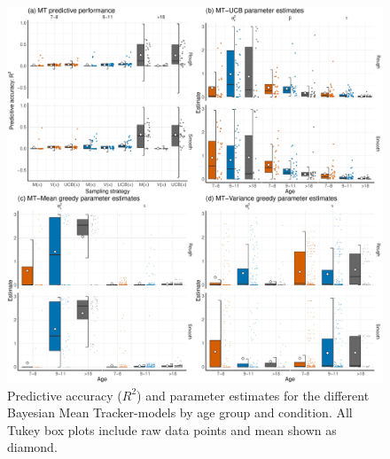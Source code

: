 \begin{figure}[ht!]
\centering
\includegraphics[width=0.9\linewidth]{fullmt.pdf}
\caption{Predictive accuracy ($R^2$) and parameter estimates for the different Bayesian Mean Tracker-models by age group and condition. All Tukey box plots include raw data points and mean shown as diamond.} 
\label{fig:mtfull}
\vspace{-1mm}
\end{figure}


